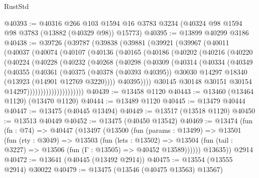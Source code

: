 \begin{lexlean}{RustStd}
\begin{coremodule}
@40393 := @40316
    @266
    @103
    @1594
    @16
    @3783
    @3234
    (@40324 @98 @1594 @98 @3783 (@13882 (@40329 @98)) @15773)
@40395 := @13899 @40299 @3186
@40438 := @39726
    (@39787
      (@39838
        (@39881
          (@39921
            (@39967
              (@40011
                (@40037
                  (@40074
                    (@40107
                      (@40136
                        (@40165
                          (@40186
                            (@40202
                              (@40216
                                (@40220
                                  (@40224
                                    (@40228
                                      (@40232
                                        (@40268
                                          (@40298
                                            (@40309
                                              (@40314
                                                (@40334
                                                  (@40349
                                                    (@40355
                                                      (@40361
                                                        (@40375
                                                          (@40378 (@40393 @40395))
                                                          @30030
                                                          @14297
                                                          @18340
                                                          (@13923 (@14901 @12769 @3220))))
                                                      @40395))))
                                              @30145
                                              @30148
                                              @30151
                                              @30154
                                              @14297)))))))))))))))))))))
@40439 := @13458 @1120
@40443 := @13460 (@13464 @1120) (@13470 @1120)
@40444 := @13489 @1120
@40445 := @13479 @40444
@40447 := @13475 (@40445 @13494)
@40449 := @13517 (@13518 @1120)
@40450 := @13513 @40449
@40452 := @13475 (@40450 @13542)
@40469 := @13474
    (fun (fn : @74) =>
    @40447
      (@13497
        (@13500
          (fun (params : @13499) =>
          @13501
            (fun (rty : @3049) =>
            @13503
              (fun (lets : @13502) =>
              @13504 (fun (tail : @3227) => @13506 (fun (Γ : @13505) => @40452 @13589))))))
        @13635))
    @2914
@40472 := @13641 (@40445 (@13492 @2914))
@40475 := @13554 (@13555 @2914) @30022
@40479 := @13475 (@13546 (@40475 @13563) @13567)

\end{coremodule}
\end{lexlean}
